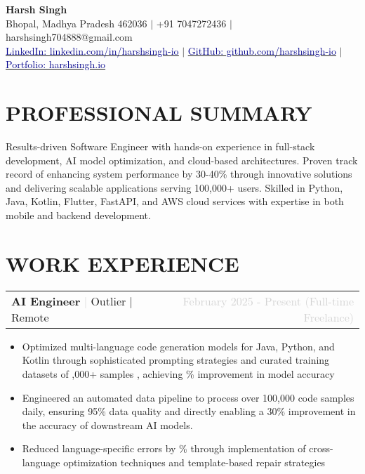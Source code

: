\documentclass[10pt, a4paper]{article}
\makeatletter
\newcommand{\uhref}[2]{\href{#1}{\underline{\textcolor{darkblue}{#2}}}}
\DeclareRobustCommand{\semibold}[1]{%
  {\fontseries{sbc}\selectfont #1}%
}
\newcommand{\resumeSubheading}[4]{
  \vspace{2pt}  %
  \noindent
  \begin{tabular*}{\textwidth}[t]{@{}l@{\extracolsep{\fill}}r@{}}
    \textbf{#1} \textcolor{lightgray}{$|$} #2 & \textcolor{lightgray}{\small #3} \\
  \end{tabular*}
  \vspace{-12pt}  %
}
\makeatother
\begin{document}
\begin{center}
    {\huge \textbf{Harsh Singh}} \\[4pt]
    {\small Bhopal, Madhya Pradesh 462036 $|$ +91 7047272436 $|$ harshsingh704888@gmail.com} \\[3pt]
    {\small \uhref{https://www.linkedin.com/in/harshsingh-io}{LinkedIn: linkedin.com/in/harshsingh-io} $|$ 
    \uhref{https://github.com/harshsingh-io}{GitHub: github.com/harshsingh-io} $|$ 
    \uhref{https://harshsingh.io}{Portfolio: harshsingh.io}}
\end{center}

\vspace{-14pt}


\section{PROFESSIONAL SUMMARY}
\vspace{-4pt}
Results-driven Software Engineer with hands-on experience in full-stack development, AI model optimization, and cloud-based architectures. Proven track record of enhancing system performance by 30-40\% through innovative solutions and delivering scalable applications serving 100,000+ users. Skilled in Python, Java, Kotlin, Flutter, FastAPI, and AWS cloud services with expertise in both mobile and backend development.

\vspace{-6pt}

\section{WORK EXPERIENCE}
\vspace{-4pt}
\resumeSubheading
{AI Engineer}{Outlier $|$ Remote}
{February 2025 - Present (Full-time Freelance)}{}
\begin{itemize}
    \item Optimized multi-language code generation models for Java, Python, and Kotlin through sophisticated prompting strategies and curated training datasets of \semibold{100,000+ samples}, achieving \semibold{30\% improvement} in model accuracy
    \item \semibold{Engineered an automated data pipeline} to process over 100,000 code samples daily, ensuring 95\% data quality and directly enabling a 30\% improvement in the accuracy of downstream AI models.
    \item Reduced language-specific errors by \semibold{40\%} through implementation of cross-language optimization techniques and template-based repair strategies
\end{itemize}
\end{document}

